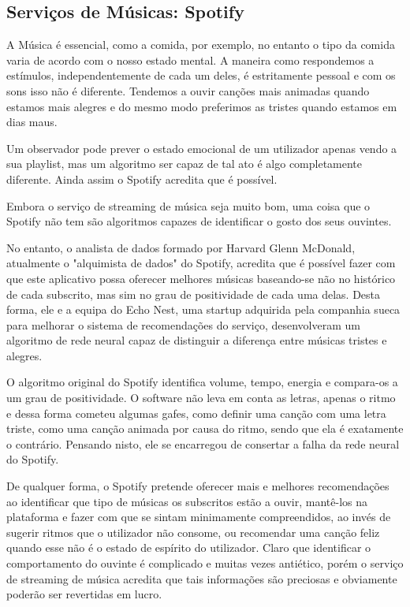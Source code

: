 \subsection{ Serviços de Músicas: Spotify}

\par A Música é essencial, como a comida, por exemplo, no entanto o tipo da comida varia de acordo com o nosso estado mental. A maneira como respondemos a estímulos, independentemente de cada um deles, é estritamente pessoal e com os sons isso não é diferente. Tendemos a ouvir canções mais animadas quando estamos mais alegres e do mesmo modo preferimos as tristes quando estamos em dias maus.
\par Um observador pode prever o estado emocional  de um utilizador apenas vendo a sua playlist, mas um algoritmo ser capaz de tal ato é algo completamente diferente. Ainda assim o Spotify acredita que é possível.
\par Embora o serviço de streaming de música seja muito bom, uma coisa que o Spotify não tem são algoritmos capazes de identificar o gosto dos seus ouvintes. 
\par No entanto, o analista de dados formado por Harvard Glenn McDonald, atualmente o "alquimista de dados" do Spotify, acredita que é possível fazer com que este aplicativo possa oferecer melhores músicas baseando-se não no histórico de cada subscrito, mas sim no grau de positividade de cada uma delas. Desta forma, ele e a equipa do Echo Nest, uma startup adquirida pela companhia sueca para melhorar o sistema de recomendações do serviço, desenvolveram um algoritmo de rede neural capaz de distinguir a diferença entre músicas tristes e alegres.
\par O algoritmo original do Spotify identifica volume, tempo, energia e compara-os a um grau de positividade. O software não leva em conta as letras, apenas o ritmo e dessa forma cometeu algumas gafes, como definir uma canção com uma letra triste, como uma canção animada por causa do ritmo, sendo que ela é exatamente o contrário. Pensando nisto, ele se encarregou de consertar a falha da rede neural do Spotify. 
\par De qualquer forma, o Spotify pretende oferecer mais e melhores recomendações ao identificar que tipo de músicas os subscritos estão a ouvir, mantê-los na plataforma e fazer com que se sintam minimamente compreendidos, ao invés de sugerir ritmos que o utilizador não consome,  ou recomendar uma canção feliz quando esse não é o estado de espírito do utilizador. Claro que identificar o comportamento do ouvinte é complicado e muitas vezes antiético, porém o serviço de streaming de música acredita que tais informações são preciosas e obviamente poderão ser revertidas em lucro. 

